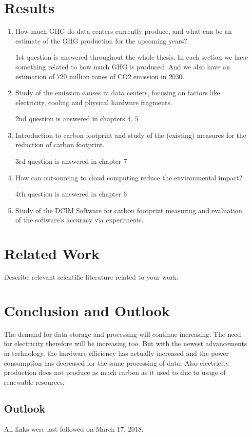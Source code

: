 \documentclass[
  a4paper,  %
  twoside,  %
  bibliography=totoc,
  headsepline,
  cleardoublepage=empty,
  parskip=half,
  draft=false
]{scrbook}
\begin{document}

\chapter{Results}

\begin{enumerate}
	\item How much GHG do data centers currently produce, and what can be an estimate of the GHG production for the upcoming years?
	
	1st question is answered throughout the whole thesis. In each section we have something related to how much GHG is produced. And we also have an estimation of 720 million tones of CO2 emission in 2030.
	
	\item Study of the emission causes in data centers, focusing on factors like electricity, cooling and physical hardware fragments.
	
	2nd question is answered in chapters 4, 5
	
	\item Introduction to carbon footprint and study of the (existing) measures for the reduction of carbon footprint.
	
	3rd question is answered in chapter 7
	
	\item How can outsourcing to cloud computing reduce the environmental impact?
	
	4th question is answered in chapter 6
	
	\item Study of the DCIM Software for carbon footprint measuring and evaluation of the software's accuracy via experiments.
\end{enumerate}


\blinddocument

\chapter{Related Work}

Describe relevant scientific literature related to your work.

\chapter{Conclusion and Outlook}
\label{chap:zusfas}
The demand for data storage and processing will continue increasing. The need for electricity therefore will be increasing too. But with the newest advancements in technology, the hardware efficiency has actually increased and the power consumption has decreased for the same processing of data. Also 
electricity production does not produce as much carbon as it used to due to usage of renewable resources. 


\section*{Outlook}

\printbibliography

All links were last followed on March 17, 2018.

\appendix


\pagestyle{empty}
\renewcommand*{\chapterpagestyle}{empty}
\Versicherung
\end{document}
